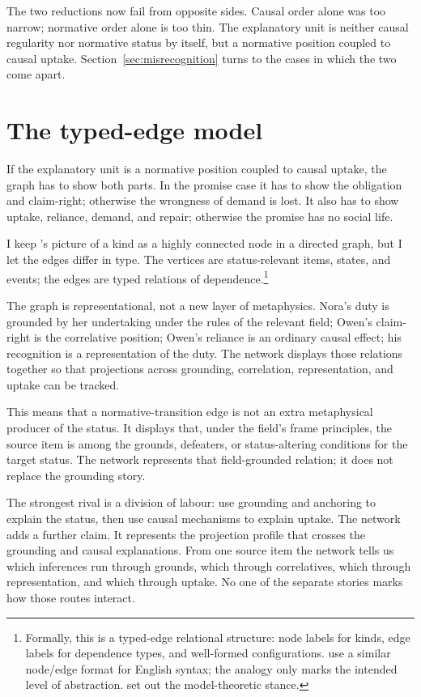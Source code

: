 \documentclass[12pt]{article}
\begin{document}
The two reductions now fail from opposite sides. Causal order alone was too narrow; normative order alone is too thin. The explanatory unit is neither causal regularity nor normative status by itself, but a normative position coupled to causal uptake. Section~\ref{sec:misrecognition} turns to the cases in which the two come apart.

\section{The typed-edge model}
\label{sec:typed-edge}

If the explanatory unit is a normative position coupled to causal uptake, the graph has to show both parts. In the promise case it has to show the obligation and claim-right; otherwise the wrongness of demand is lost. It also has to show uptake, reliance, demand, and repair; otherwise the promise has no social life.

I keep \textcite{khalidi2018nodes}'s picture of a kind as a highly connected node in a directed graph, but I let the edges differ in type. The vertices are status-relevant items, states, and events; the edges are typed relations of dependence.\footnote{Formally, this is a typed-edge relational structure: node labels for kinds, edge labels for dependence types, and well-formed configurations. \textcite{pullumRogers2008Expressive} use a similar node/edge format for English syntax; the analogy only marks the intended level of abstraction. \textcite{pullum2001} set out the model-theoretic stance.}

The graph is representational, not a new layer of metaphysics. Nora's duty is grounded by her undertaking under the rules of the relevant field; Owen's claim-right is the correlative position; Owen's reliance is an ordinary causal effect; his recognition is a representation of the duty. The network displays those relations together so that projections across grounding, correlation, representation, and uptake can be tracked.

This means that a normative-transition edge is not an extra metaphysical producer of the status. It displays that, under the field's frame principles, the source item is among the grounds, defeaters, or status-altering conditions for the target status. The network represents that field-grounded relation; it does not replace the grounding story.

The strongest rival is a division of labour: use grounding and anchoring to explain the status, then use causal mechanisms to explain uptake. The network adds a further claim. It represents the projection profile that crosses the grounding and causal explanations. From one source item the network tells us which inferences run through grounds, which through correlatives, which through representation, and which through uptake. No one of the separate stories marks how those routes interact.
\end{document}

